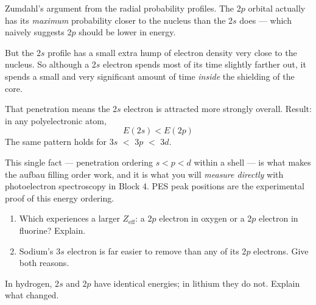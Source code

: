 \documentclass{apchem-notes}
\begin{document}
\begin{workedexample}
Zumdahl's argument from the radial probability profiles. The 2$p$ orbital
actually has its \emph{maximum} probability closer to the nucleus than the
2$s$ does --- which naively suggests 2$p$ should be lower in energy.

But the 2$s$ profile has a small extra hump of electron density very close
to the nucleus. So although a 2$s$ electron spends most of its time slightly
farther out, it spends a small and very significant amount of time
\emph{inside} the shielding of the core.

That penetration means the 2$s$ electron is attracted more strongly overall.
Result: in any polyelectronic atom,
\[ E(2s) < E(2p) \]
The same pattern holds for 3$s$ $<$ 3$p$ $<$ 3$d$.
\end{workedexample}

\begin{apcnote}
This single fact --- penetration ordering $s < p < d$ within a shell --- is
what makes the aufbau filling order work, and it is what you will
\emph{measure directly} with photoelectron spectroscopy in Block 4. PES peak
positions are the experimental proof of this energy ordering.
\end{apcnote}


\begin{enumerate}[leftmargin=*,itemsep=0.4em]
  \item Which experiences a larger $Z_{\text{eff}}$: a 2$p$ electron in
        oxygen or a 2$p$ electron in fluorine? Explain.
  \item Sodium's 3$s$ electron is far easier to remove than any of its 2$p$
        electrons. Give both reasons.
\end{enumerate}

\begin{exitticket}
In hydrogen, 2$s$ and 2$p$ have identical energies; in lithium they do not.
Explain what changed. 
\end{exitticket}
\end{document}
